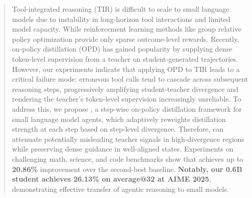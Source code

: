 \vspace{-1.95em}
\begin{abstract}
Tool-integrated reasoning (TIR) is difficult to scale to small language models due to instability in long-horizon tool interactions and limited model capacity. While reinforcement learning methods like group relative policy optimization provide only sparse outcome-level rewards. Recently, on-policy distillation (OPD) has gained popularity by supplying dense token-level supervision from a teacher on student-generated trajectories. However, our experiments indicate that applying OPD to TIR leads to a critical failure mode: erroneous tool calls tend to cascade across subsequent reasoning steps, progressively amplifying student-teacher divergence and rendering the teacher's token-level supervision increasingly unreliable.
To address this, we propose \ourmodel, a step-wise on-policy distillation framework for small language model agents, which adaptively reweights distillation strength at each step based on step-level divergence. Therefore, \ourmodel can attenuate potentially misleading teacher signals in high-divergence regions while preserving dense guidance in well-aligned states. Experiments on challenging math, science, and code benchmarks show that \ourmodel achieves up to \textbf{20.86\%} improvement over the second-best baseline. \textbf{Notably, our 0.6B student achieves 26.13\% on average@32 at AIME 2025}, demonstrating effective transfer of agentic reasoning to small models.

\end{abstract}
